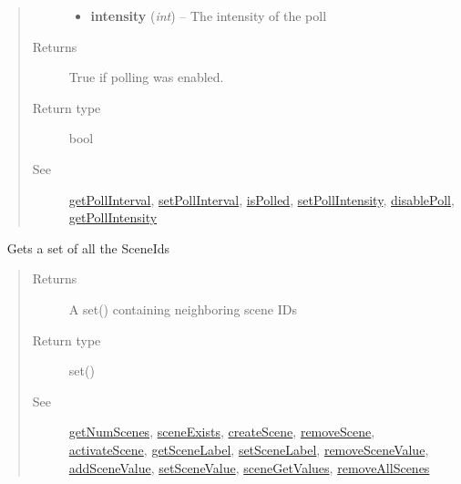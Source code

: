 \documentclass[letterpaper,10pt,english]{sphinxmanual}
\begin{document}
\begin{fulllineitems}
\begin{fulllineitems}
\begin{quote}
\begin{description}
\begin{itemize}
\item {} 
\textbf{intensity} (\emph{int}) -- The intensity of the poll

\end{itemize}

\item[{Returns}] \leavevmode
True if polling was enabled.

\item[{Return type}] \leavevmode
bool

\item[{See}] \leavevmode
{\hyperref[libopenzwave:getpollinterval]{getPollInterval}}, {\hyperref[libopenzwave:setpollinterval]{setPollInterval}}, {\hyperref[libopenzwave:ispolled]{isPolled}}, {\hyperref[libopenzwave:setpollintensity]{setPollIntensity}}, {\hyperref[libopenzwave:disablepoll]{disablePoll}}, {\hyperref[libopenzwave:getpollintensity]{getPollIntensity}}

\end{description}\end{quote}

\end{fulllineitems}


\begin{fulllineitems}
\label{libopenzwave:libopenzwave.PyManager.getAllScenes}~\label{libopenzwave:getallscenes}
Gets a set of all the SceneIds
\begin{quote}\begin{description}
\item[{Returns}] \leavevmode
A set() containing neighboring scene IDs

\item[{Return type}] \leavevmode
set()

\item[{See}] \leavevmode
{\hyperref[libopenzwave:getnumscenes]{getNumScenes}}, {\hyperref[libopenzwave:sceneexists]{sceneExists}}, {\hyperref[libopenzwave:createscene]{createScene}}, {\hyperref[libopenzwave:removescene]{removeScene}}, {\hyperref[libopenzwave:activatescene]{activateScene}}, {\hyperref[libopenzwave:getscenelabel]{getSceneLabel}}, {\hyperref[libopenzwave:setscenelabel]{setSceneLabel}}, {\hyperref[libopenzwave:removescenevalue]{removeSceneValue}}, {\hyperref[libopenzwave:addscenevalue]{addSceneValue}}, {\hyperref[libopenzwave:setscenevalue]{setSceneValue}}, {\hyperref[libopenzwave:scenegetvalues]{sceneGetValues}}, {\hyperref[libopenzwave:removeallscenes]{removeAllScenes}}


\end{description}
\end{quote}
\end{fulllineitems}
\end{fulllineitems}
\end{document}
